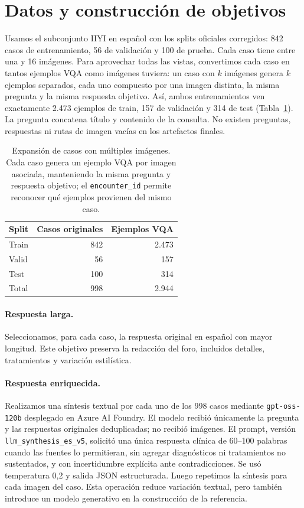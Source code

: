 \documentclass[11pt]{article}
\begin{document}
\section{Datos y construcción de objetivos}

Usamos el subconjunto IIYI en español con los splits oficiales corregidos: 842 casos de entrenamiento, 56 de validación y 100 de prueba. Cada caso tiene entre una y 16 imágenes. Para aprovechar todas las vistas, convertimos cada caso en tantos ejemplos VQA como imágenes tuviera: un caso con $k$ imágenes genera $k$ ejemplos separados, cada uno compuesto por una imagen distinta, la misma pregunta y la misma respuesta objetivo. Así, ambos entrenamientos ven exactamente 2.473 ejemplos de train, 157 de validación y 314 de test (Tabla~\ref{tab:data}). La pregunta concatena título y contenido de la consulta. No existen preguntas, respuestas ni rutas de imagen vacías en los artefactos finales.

\begin{table}[t]
\centering
\small
\begin{tabular}{lrr}
\toprule
Split & Casos originales & Ejemplos VQA \\
\midrule
Train & 842 & 2.473 \\
Valid & 56  & 157 \\
Test  & 100 & 314 \\
\midrule
Total & 998 & 2.944 \\
\bottomrule
\end{tabular}
\caption{Expansión de casos con múltiples imágenes. Cada caso genera un ejemplo VQA por imagen asociada, manteniendo la misma pregunta y respuesta objetivo; el \texttt{encounter\_id} permite reconocer qué ejemplos provienen del mismo caso.}
\label{tab:data}
\end{table}

\paragraph{Respuesta larga.}
Seleccionamos, para cada caso, la respuesta original en español con mayor longitud. Este objetivo preserva la redacción del foro, incluidos detalles, tratamientos y variación estilística.

\paragraph{Respuesta enriquecida.}
Realizamos una síntesis textual por cada uno de los 998 casos mediante \texttt{gpt-oss-120b} desplegado en Azure AI Foundry. El modelo recibió únicamente la pregunta y las respuestas originales deduplicadas; no recibió imágenes. El prompt, versión \texttt{llm\_synthesis\_es\_v5}, solicitó una única respuesta clínica de 60--100 palabras cuando las fuentes lo permitieran, sin agregar diagnósticos ni tratamientos no sustentados, y con incertidumbre explícita ante contradicciones. Se usó temperatura 0,2 y salida JSON estructurada. Luego repetimos la síntesis para cada imagen del caso. Esta operación reduce variación textual, pero también introduce un modelo generativo en la construcción de la referencia.
\end{document}
